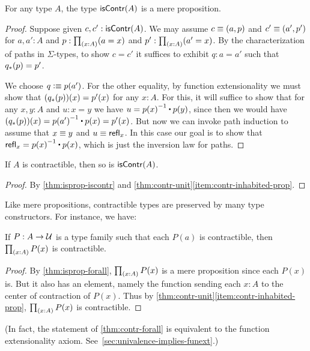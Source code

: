 \begin{lem}\label{thm:isprop-iscontr}
  For any type $A$, the type $\mathsf{isContr}(A)$ is a mere proposition.
\end{lem}
\begin{proof}
  Suppose given $c,c':\mathsf{isContr}(A)$.
  We may assume $c\equiv(a,p)$ and $c'\equiv(a',p')$ for $a,a':A$ and $p:\prd{x:A} (a=x)$ and $p':\prd{x:A} (a'=x)$.
  By the characterization of paths in $\Sigma$-types, to show $c=c'$ it suffices to exhibit $q:a=a'$ such that ${q}_{*}\mathopen{}\left({p}\right)\mathclose{}=p'$.

  We choose $q\vcentcolon\equiv p(a')$.
  For the other equality, by function extensionality we must show that $({q}_{*}\mathopen{}\left({p}\right)\mathclose{})(x)=p'(x)$ for any $x:A$.
  For this, it will suffice to show that for any $x,y:A$ and $u:x=y$ we have $u= \opp{p(x)} \ct p(y)$, since then we would have $(\trans q p)(x) = \opp{p(a')} \ct p(x) = p'(x)$.
  But now we can invoke path induction to assume that $x\equiv y$ and $u\equiv \mathsf{refl}_{x}$.
  In this case our goal is to show that $\refl x = \opp{p(x)} \ct p(x)$, which is just the inversion law for paths.
\end{proof}

\begin{cor}\label{thm:contr-contr}
  If $A$ is contractible, then so is $\mathsf{isContr}(A)$.
\end{cor}
\begin{proof}
  By \autoref{thm:isprop-iscontr} and \autoref{thm:contr-unit}\ref{item:contr-inhabited-prop}.
\end{proof}

Like mere propositions, contractible types are preserved by many type constructors.
For instance, we have:

\begin{lem}\label{thm:contr-forall}
  If $P:A\to\mathcal{U}$ is a type family such that each $P(a)$ is contractible, then $\prd{x:A} P(x)$ is contractible.
\end{lem}
\begin{proof}
  By \autoref{thm:isprop-forall}, $\prd{x:A} P(x)$ is a mere proposition since each $P(x)$ is.
  But it also has an element, namely the function sending each $x:A$ to the center of contraction of $P(x)$.
  Thus by \autoref{thm:contr-unit}\ref{item:contr-inhabited-prop}, $\prd{x:A} P(x)$ is contractible.
\end{proof}

%
(In fact, the statement of \autoref{thm:contr-forall} is equivalent to the function extensionality axiom.
See~\autoref{sec:univalence-implies-funext}.)

